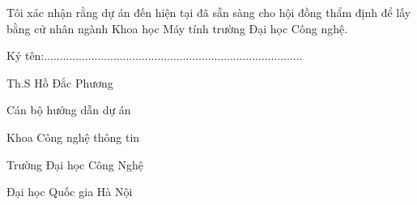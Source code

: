 Tôi xác nhận rằng dự án đến hiện tại đã sẵn sàng cho hội đồng thẩm định để lấy bằng cử nhân ngành Khoa học Máy tính trường Đại học Công nghệ.

\begin{flushright}
Ký tên:..................................................................................

Th.S Hồ Đắc Phương

Cán bộ hướng dẫn dự án

Khoa Công nghệ thông tin

Trường Đại học Công Nghệ

Đại học Quốc gia Hà Nội
\end{flushright}
